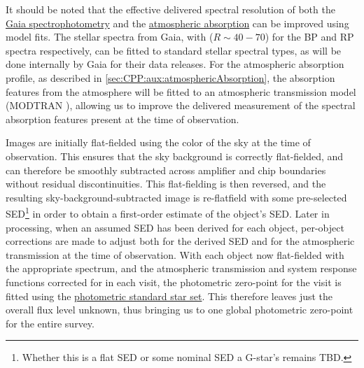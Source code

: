 It should be noted that the effective delivered spectral resolution of both the \hyperref[sec:CPP:output:spectrophotometricStandards]{Gaia spectrophotometry} and the \hyperref[sec:CPP:aux:atmosphericAbsorption]{atmospheric absorption} can be improved using model fits. The stellar spectra from Gaia, with ($R \sim 40-70$) for the BP and RP spectra respectively\cite{GaiaSpecs}, can be fitted to standard stellar spectral types, as will be done internally by Gaia for their data releases\citep{2010MNRAS.403...96B}. For the atmospheric absorption profile, as described in \secsymbol\ref{sec:CPP:aux:atmosphericAbsorption}, the absorption features from the atmosphere will be fitted to an atmospheric transmission model (\eg MODTRAN \etc), allowing us to improve the delivered measurement of the spectral absorption features present at the time of observation.


Images are initially flat-fielded using the color of the sky at the time of observation. This ensures that the sky background is correctly flat-fielded, and can therefore be smoothly subtracted across amplifier and chip boundaries without residual discontinuities. This flat-fielding is then reversed, and the resulting sky-background-subtracted image is re-flatfield with some pre-selected SED\footnote{Whether this is a flat SED or some nominal SED \eg a G-star's remains TBD.} in order to obtain a first-order estimate of the object's SED. Later in processing, when an assumed SED has been derived for each object, per-object corrections are made to adjust both for the derived SED and for the atmospheric transmission at the time of observation.
With each object now flat-fielded with the appropriate spectrum, and the atmospheric transmission and system response functions corrected for in each visit, the photometric zero-point for the visit is fitted using the \hyperref[sec:CPP:output:spectrophotometricStandards]{photometric standard star set}. This therefore leaves just the overall flux level unknown, thus bringing us to one global photometric zero-point for the entire survey.


